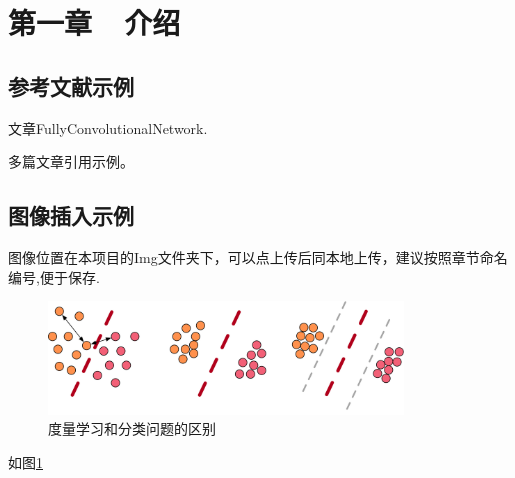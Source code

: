 \pagestyle{fancy}
\setcounter{page}{1}
\lhead{}
\rhead{}
\lfoot{}
\cfoot{\thepage}
\rfoot{}


\section*{第一章~~介绍}
\setcounter{section}{1} \setcounter{subsection}{0}

\subsection{参考文献示例}
\par 文章FullyConvolutionalNetwork.
\par 多篇文章引用示例。
\subsection{图像插入示例}
\par 图像位置在本项目的Img文件夹下，可以点上传后同本地上传，建议按照章节命名编号,便于保存.
\begin{figure}[!htbp]
    \centering    
    \includegraphics[height=3cm]{Img/c01_classification.png}
    \caption{度量学习和分类问题的区别}
    \label{classification}
\end{figure}
\par 如图\ref{classification}

\newpage

